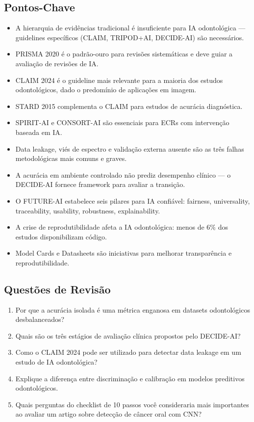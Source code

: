 \subsection{Pontos-Chave}
\begin{itemize}
    \item A hierarquia de evidências tradicional é insuficiente para IA odontológica — guidelines específicos (CLAIM, TRIPOD+AI, DECIDE-AI) são necessários.
    \item PRISMA 2020 é o padrão-ouro para revisões sistemáticas e deve guiar a avaliação de revisões de IA.
    \item CLAIM 2024 é o guideline mais relevante para a maioria dos estudos odontológicos, dado o predomínio de aplicações em imagem.
    \item STARD 2015 complementa o CLAIM para estudos de acurácia diagnóstica.
    \item SPIRIT-AI e CONSORT-AI são essenciais para ECRs com intervenção baseada em IA.
    \item Data leakage, viés de espectro e validação externa ausente são as três falhas metodológicas mais comuns e graves.
    \item A acurácia em ambiente controlado não prediz desempenho clínico — o DECIDE-AI fornece framework para avaliar a transição.
    \item O FUTURE-AI estabelece seis pilares para IA confiável: fairness, universality, traceability, usability, robustness, explainability.
    \item A crise de reprodutibilidade afeta a IA odontológica: menos de 6\% dos estudos disponibilizam código.
    \item Model Cards e Datasheets são iniciativas para melhorar transparência e reprodutibilidade.
\end{itemize}

\subsection{Questões de Revisão}
\begin{enumerate}
    \item Por que a acurácia isolada é uma métrica enganosa em datasets odontológicos desbalanceados?
    \item Quais são os três estágios de avaliação clínica propostos pelo DECIDE-AI?
    \item Como o CLAIM 2024 pode ser utilizado para detectar data leakage em um estudo de IA odontológica?
    \item Explique a diferença entre discriminação e calibração em modelos preditivos odontológicos.
    \item Quais perguntas do checklist de 10 passos você consideraria mais importantes ao avaliar um artigo sobre detecção de câncer oral com CNN?
\end{enumerate}

